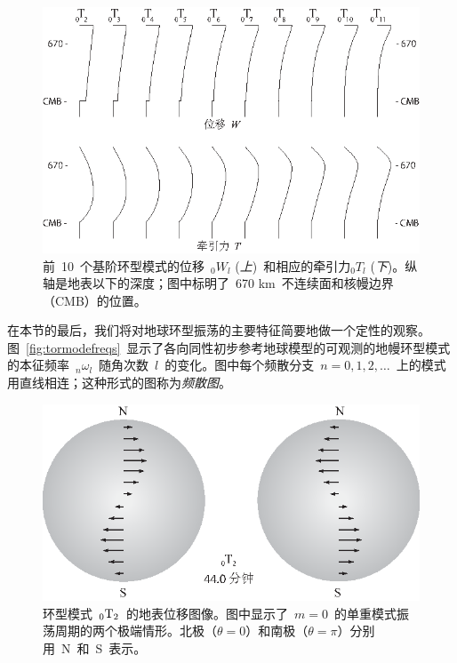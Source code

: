 \begin{figure}[!b]
\begin{center}
\includegraphics{../figures/chap08/fig04.eps}
\end{center}
\caption[Lovemodes]{\label{fig:Lovemodes}
前~10~个基阶环型模式的位移~${}_0W_l$ ({\em 上\/})~和相应的牵引力${}_0T_l$ ({\em 下\/})。纵轴是地表以下的深度；图中标明了~670 km~不连续面和核幔边界（CMB）的位置。
}
\end{figure}
在本节的最后，我们将对地球环型振荡的主要特征简要地做一个定性的观察。图~\ref{fig:tormodefreqs}~显示了各向同性初步参考地球模型的可观测的地幔环型模式的本征频率~${}_n\omega_l$~随角次数~$l$~的变化。图中每个频散分支~$n=0,1,2,\ldots$~上的模式用直线相连；这种形式的图称为{\em 频散图\/}。
%
\begin{figure}[!t]
\begin{center}
\includegraphics{../figures/chap08/fig05.eps}
\end{center}
\caption[0T2displacements]{\label{fig:0T2}
环型模式~${}_0{\rm T}_2$~的地表位移图像。图中显示了~$m=0$~的单重模式振荡周期的两个极端情形。北极（$\theta=0$）和南极（$\theta=\pi$）分别用~N~和~S~表示。
}
\end{figure}
